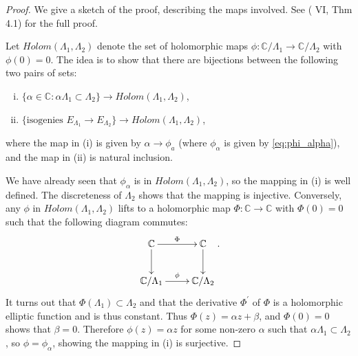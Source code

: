 \begin{proof}
  We give a sketch of the proof, describing the maps involved. See
  (\cite{silverman86} VI, Thm 4.1) for the full proof.

  Let $Holom(\Lambda_{1},\Lambda_{2})$ denote the set of holomorphic maps $\phi :
  \mathbb{C} / \Lambda_{1} \rightarrow \mathbb{C} / \Lambda_{2}$ with $\phi (0) = 0$.
  The idea is to show that there are bijections between the following two pairs of
  sets:
  \begin{enumerate}[(i)]
  \item $\{ \alpha \in \mathbb{C} : \alpha \Lambda_{1} \subset \Lambda_{2} \}
    \rightarrow Holom(\Lambda_{1},\Lambda_{2})$,
  \item $\{ \text{isogenies } E_{\Lambda_{1}} \rightarrow E_{\Lambda_{2}} \}
    \rightarrow Holom(\Lambda_{1},\Lambda_{2})$,
     
   \end{enumerate}
   where the map in (i) is given by $\alpha \rightarrow \phi_{a}$ (where
   $\phi_{\alpha}$ is given by \eqref{eq:phi_alpha}), and the map in (ii) is natural
   inclusion.

   We have already seen that $\phi_{\alpha}$ is in $Holom(\Lambda_{1},\Lambda_{2})$,
   so the mapping in (i) is well defined. The discreteness of $\Lambda_{2}$ shows
   that the mapping is injective. Conversely, any $\phi$ in
   $Holom(\Lambda_{1},\Lambda_{2})$ lifts to a holomorphic map $\Phi : \mathbb{C}
   \rightarrow \mathbb{C}$ with $\Phi (0) = 0$ such that the following diagram
   commutes:
   \begin{equation*}
     \xymatrix{
       \mathbb{C} \ar[d] \ar[r]^{\Phi} & \mathbb{C}  \ar[d]\\
       \mathbb{C} / \Lambda_{1} \ar[r]^{\phi }& \mathbb{C} / \Lambda_{2}
     }.     
   \end{equation*}
   It turns out that $\Phi (\Lambda_{1}) \subset \Lambda_{2}$ and that the derivative
   $\Phi^{\prime}$ of $\Phi$ is a holomorphic elliptic function and is thus constant.
   Thus $\Phi (z) = \alpha z + \beta$, and $\Phi (0) = 0$ shows that $\beta = 0$.
   Therefore $\phi (z) = \alpha z$ for some non-zero $\alpha$ such that $\alpha
   \Lambda_{1} \subset \Lambda_{2}$, so $\phi = \phi_{\alpha}$, showing the mapping
   in (i) is surjective.


\end{proof}
